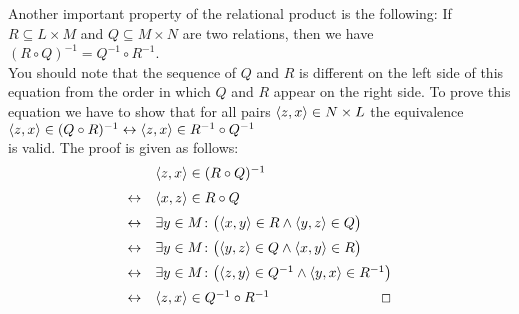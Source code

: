 Another important property of the relational product is the following: If
 $R \subseteq L \times M$ and $Q \subseteq M \times N$ are two relations, then we have \\[0.2cm]
\hspace*{1.3cm} $(R \circ Q)^{-1} = Q^{-1} \circ R^{-1}$. \\[0.2cm]
You should note that the sequence of  $Q$ and $R$ is different on the left side of this
equation
from the order in which $Q$ and $R$ appear on the right side.  To prove this equation we
have to show that for all pairs $\pair(z,x) \in N \times L$ the equivalence \\[0.2cm]
\hspace*{1.3cm} $\pair(z,x) \in (Q \circ R)^{-1} \leftrightarrow \pair(z,x) \in R^{-1} \circ Q^{-1}$ \\[0.2cm]
is valid.  The proof is given as follows: 
\[ 
\begin{array}{cl}
                & \pair(z,x) \in (R \circ Q)^{-1}                                             \\[0.2cm]
\leftrightarrow & \pair(x,z) \in R \circ Q                                                    \\[0.2cm]
\leftrightarrow & \exists y \in M \colon \bigl(\pair(x,y) \in R \wedge \pair(y,z) \in Q\bigr) \\[0.2cm]
\leftrightarrow & \exists y \in M \colon \bigl(\pair(y,z) \in Q \wedge \pair(x,y) \in R\bigr) \\[0.2cm]
\leftrightarrow & \exists y \in M \colon \bigl(\pair(z,y) \in Q^{-1} \wedge \pair(y,x) \in R^{-1}\bigr) 
                  \\[0.2cm]
\leftrightarrow & \pair(z,x) \in Q^{-1} \circ R^{-1}   \hspace*{\fill} \Box                                       
\end{array}
\]
\vspace{0.2cm}

